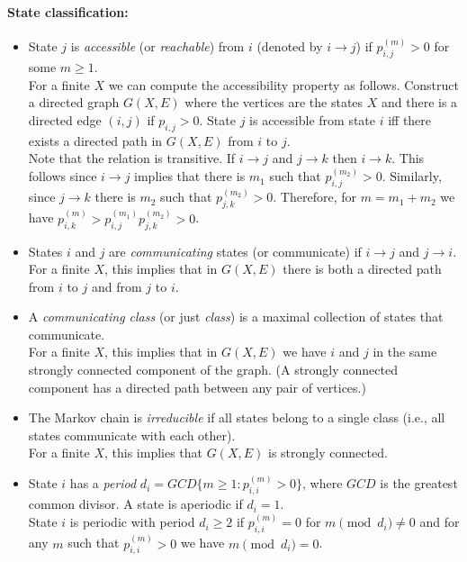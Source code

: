 \paragraph{State classification:}

\begin{itemize}
\item State $j$ is \textit{accessible} (or \textit{reachable}) from $i$  (denoted by $i \to j$) if $p_{i,j}^{(m)} > 0$ for some $m \ge
1$.\\
For a finite $X$  we can compute the accessibility property as
follows. Construct a directed graph $G(X,E)$ where the vertices are
the states $X$ and there is a directed edge $(i,j)$ if $p_{i,j}>0$.
State $j$ is accessible from state $i$ iff there exists a directed
path in $G(X,E)$ from $i$ to $j$.\\
Note that the relation is transitive. If $i \to j$ and $j \to k$ then $i \to k$. This follows since $i \to j$ implies that there is $m_1$ such that  $p_{i,j}^{(m_2)} > 0$. Similarly, since $j \to k$ there is $m_2$ such that  $p_{j,k}^{(m_2)} > 0$. Therefore, for $m=m_1+m_2$ we have $p_{i,k}^{(m)} > p_{i,j}^{(m_1)}p_{j,k}^{(m_2)}>0$.
\item States $i$ and $j$ are \textit{communicating} states (or communicate) if $i \to j$ and $j \to
i$.\\
For a finite $X$, this implies that in $G(X,E)$ there is both a
directed path from $i$ to $j$ and from $j$ to $i$.
\item A \textit{communicating class} (or just
\emph{class}) is a maximal collection of states that communicate.\\
For a finite $X$, this implies that in $G(X,E)$ we have $i$ and $j$
in the same strongly connected component of the graph. (A strongly
connected component has a directed path between any pair of
vertices.)
\item The Markov chain is
\textit{irreducible} if all states belong to a single class (i.e.,
all states communicate with each other).\\
For a finite $X$, this implies that $G(X,E)$ is strongly
connected.
\item
State $i$ has a \textit{period} $d_i=GCD \{m\geq
1:p_{i,i}^{(m)}>0\}$, where $GCD$ is the greatest common divisor. A
state is aperiodic if $d_i=1$.\\
State $i$ is periodic with period $d_i \ge 2$ if  $p_{i,i}^{(m)} =
0$ for $m \pmod {d_i} \neq 0$ and for any $m$ such that
$p_{i,i}^{(m)} > 0$ we have $m \pmod {d_i} =0$.\\

\end{itemize}
